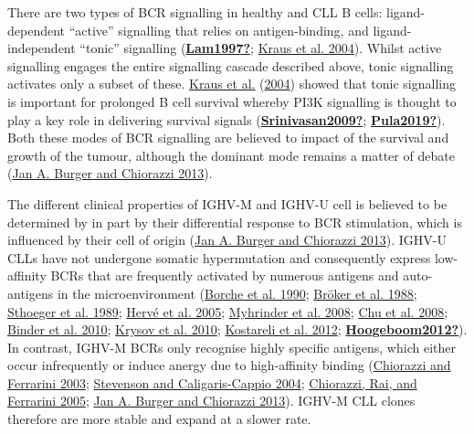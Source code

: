 \documentclass[11pt, a4paper, twosided]{book}
\begin{document}
There are two types of BCR signalling in healthy and CLL B cells: ligand-dependent ``active'' signalling that relies on antigen-binding, and ligand-independent ``tonic'' signalling (\protect\hyperlink{ref-Lam1997}{\textbf{Lam1997?}}; \protect\hyperlink{ref-Kraus2004}{Kraus et al. 2004}). Whilst active signalling engages the entire signalling cascade described above, tonic signalling activates only a subset of these. \protect\hyperlink{ref-Kraus2004}{Kraus et al.} (\protect\hyperlink{ref-Kraus2004}{2004}) showed that tonic signalling is important for prolonged B cell survival whereby PI3K signalling is thought to play a key role in delivering survival signals (\protect\hyperlink{ref-Srinivasan2009}{\textbf{Srinivasan2009?}}; \protect\hyperlink{ref-Pula2019}{\textbf{Pula2019?}}). Both these modes of BCR signalling are believed to impact of the survival and growth of the tumour, although the dominant mode remains a matter of debate (\protect\hyperlink{ref-Burger2013}{Jan A. Burger and Chiorazzi 2013}).

The different clinical properties of IGHV-M and IGHV-U cell is believed to be determined by in part by their differential response to BCR stimulation, which is influenced by their cell of origin (\protect\hyperlink{ref-Burger2013}{Jan A. Burger and Chiorazzi 2013}). IGHV-U CLLs have not undergone somatic hypermutation and consequently express low-affinity BCRs that are frequently activated by numerous antigens and auto-antigens in the microenvironment (\protect\hyperlink{ref-Borche1990}{Borche et al. 1990}; \protect\hyperlink{ref-Broker1988}{Bröker et al. 1988}; \protect\hyperlink{ref-Sthoeger1989}{Sthoeger et al. 1989}; \protect\hyperlink{ref-Herve2005}{Hervé et al. 2005}; \protect\hyperlink{ref-Lanemo2008}{Myhrinder et al. 2008}; \protect\hyperlink{ref-Chu2008}{Chu et al. 2008}; \protect\hyperlink{ref-Binder2010}{Binder et al. 2010}; \protect\hyperlink{ref-Krysov2010}{Krysov et al. 2010}; \protect\hyperlink{ref-Kostareli2012}{Kostareli et al. 2012}; \protect\hyperlink{ref-Hoogeboom2012}{\textbf{Hoogeboom2012?}}). In contrast, IGHV-M BCRs only recognise highly specific antigens, which either occur infrequently or induce anergy due to high-affinity binding (\protect\hyperlink{ref-Chiorazzi2003}{Chiorazzi and Ferrarini 2003}; \protect\hyperlink{ref-Stevenson2004}{Stevenson and Caligaris-Cappio 2004}; \protect\hyperlink{ref-Chiorazzi2005}{Chiorazzi, Rai, and Ferrarini 2005}; \protect\hyperlink{ref-Burger2013}{Jan A. Burger and Chiorazzi 2013}). IGHV-M CLL clones therefore are more stable and expand at a slower rate.
\end{document}
